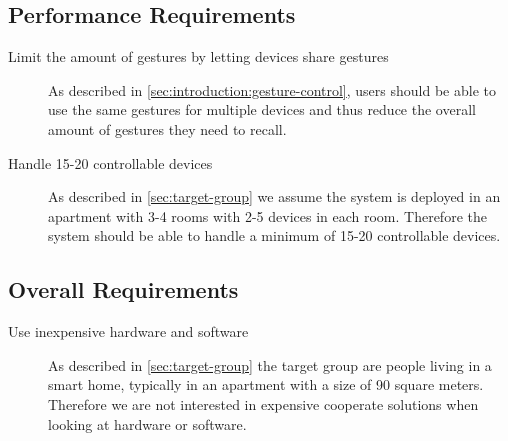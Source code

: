 
\subsection{Performance Requirements}

\begin{description}
\item[Limit the amount of gestures by letting devices share gestures] As described in \cref{sec:introduction:gesture-control}, users should be able to use the same gestures for multiple devices and thus reduce the overall amount of gestures they need to recall.
\item[Handle 15-20 controllable devices] As described in \cref{sec:target-group} we assume the system is deployed in an apartment with 3-4 rooms with 2-5 devices in each room. Therefore the system should be able to handle a minimum of 15-20 controllable devices.
\end{description}

\subsection{Overall Requirements}

\begin{description}
\item[Use inexpensive hardware and software] As described in \cref{sec:target-group} the target group are people living in a smart home, typically in an apartment with a size of 90 square meters. Therefore we are not interested in expensive cooperate solutions when looking at hardware or software.
\end{description}

